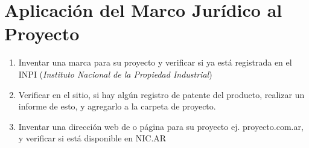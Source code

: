 \documentclass[../main]{subfiles}
\begin{document}
\chapter{Aplicación del Marco Jurídico al Proyecto}
\begin{enumerate}
  \item  Inventar una marca para su proyecto y verificar si ya está
    registrada en el INPI (\emph{Instituto Nacional de la Propiedad Industrial})


  \item Verificar en el sitio, si hay algún registro de patente del
    producto, realizar un informe de esto, y agregarlo a la carpeta de proyecto.

  \item Inventar una dirección web de o página para su proyecto ej.
    proyecto.com.ar, y verificar si está disponible en NIC.AR
\end{enumerate}
\end{document}
